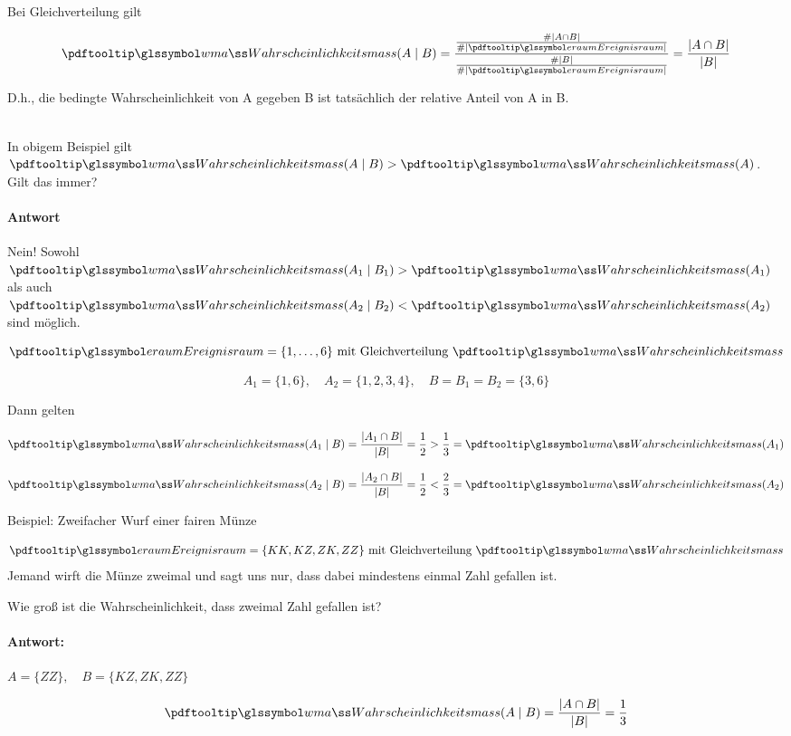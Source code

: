 \begin{beo}   \\
    Bei Gleichverteilung gilt

    \[
        \pe(A \mid B)
        =
        \frac{\frac{\#|A \cap B|}{\#|\eraum|}}{\frac{\#|B|}{\#|\eraum|}} =
        \frac{|A \cap B|}{|B|}
    \]

    D.h., die bedingte Wahrscheinlichkeit von A gegeben B ist tatsächlich der relative Anteil von A in B\@.
\end{beo}
\begin{fr}  \\
In obigem Beispiel gilt $\pe(A \mid B) > \pe(A)$.
    Gilt das immer?

    \paragraph{Antwort} Nein!
    Sowohl $\pe(A_1 \mid B_1) > \pe(A_1)$ als auch $\pe(A_2 \mid B_2) < \pe(A_2)$ sind möglich.

\end{fr}
\begin{bsp} 
\[
        \eraum = \{1,\dots,6\} \text{ mit Gleichverteilung } \pe
    \]

    \[
        A_1 = \{1,6\}, \quad A_2 = \{1,2,3,4\}, \quad B = B_1 = B_2 = \{3,6\}
    \]

    Dann gelten

    \[
        \pe(A_1 \mid B) = \frac{|A_1 \cap B|}{|B|} = \frac{1}{2} > \frac{1}{3} = \pe(A_1)
    \]

    \[
        \pe(A_2 \mid B) = \frac{|A_2 \cap B|}{|B|} = \frac{1}{2} < \frac{2}{3} = \pe(A_2)
    \]
\end{bsp}





\begin{bsp}

    Beispiel: Zweifacher Wurf einer fairen Münze 

    \[
        \eraum = \{KK, KZ, ZK, ZZ\} \text{ mit Gleichverteilung } \pe
    \]
    Jemand wirft die Münze zweimal und sagt uns nur, dass dabei mindestens einmal Zahl gefallen ist.

    Wie groß ist die Wahrscheinlichkeit, dass zweimal Zahl gefallen ist?

    \paragraph{Antwort:}
    $A = \{ZZ\}, \quad B = \{KZ, ZK, ZZ\}$

    \[
        \pe(A \mid B) = \frac{|A \cap B|}{|B|} = \frac{1}{3}
    \]

\end{bsp}

